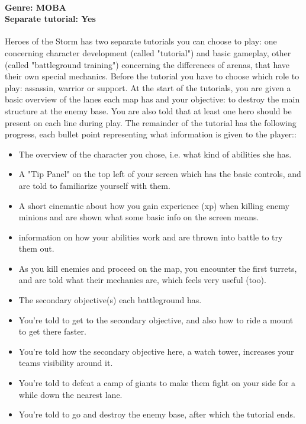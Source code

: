 \paragraph{Genre: MOBA \\ Separate tutorial: Yes \\}
Heroes of the Storm has two separate tutorials you can choose to play: one concerning character development (called "tutorial") and basic gameplay, other (called "battleground training") concerning the differences of arenas, that have their own special mechanics.
Before the tutorial you have to choose which role to play: assassin, warrior or support.
At the start of the tutorials, you are given a basic overview of the lanes each map has and your objective: to destroy the main structure at the enemy base. You are also told that at least one hero should be present on each line during play. The remainder of the tutorial has the following progress, each bullet point representing what information is given to the player::
\begin{itemize}

\item The overview of the character you chose, i.e. what kind of abilities she has.
\item A "Tip Panel" on the top left of your screen which has the basic controls, and are told to familiarize yourself with them.
\item A short cinematic about how you gain experience (xp) when killing enemy minions and are shown what some basic info on the screen means.
\item information on how your abilities work and are thrown into battle to try them out.
\item As you kill enemies and proceed on the map, you encounter the first turrets, and are told what their mechanics are, which feels very useful (too).
\item The secondary objective(s) each battleground has.
\item You're told to get to the secondary objective, and also how to ride a mount to get there faster.
\item You're told how the secondary objective here, a watch tower, increases your teams visibility around it.
\item You're told to defeat a camp of giants to make them fight on your side for a while down the nearest lane.
\item You're told to go and destroy the enemy base, after which the tutorial ends.
\end{itemize}

